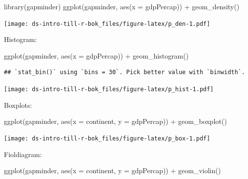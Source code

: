 \documentclass[
]{book}
\newenvironment{Shaded}{\begin{snugshade}}{\end{snugshade}}
\newcommand{\AttributeTok}[1]{\textcolor[rgb]{0.77,0.63,0.00}{#1}}
\newcommand{\FunctionTok}[1]{\textcolor[rgb]{0.00,0.00,0.00}{#1}}
\newcommand{\NormalTok}[1]{#1}
\newcommand{\SpecialCharTok}[1]{\textcolor[rgb]{0.00,0.00,0.00}{#1}}
\begin{document}
\begin{Shaded}
\begin{Highlighting}[]
\FunctionTok{library}\NormalTok{(gapminder)}
\FunctionTok{ggplot}\NormalTok{(gapminder, }\FunctionTok{aes}\NormalTok{(}\AttributeTok{x =}\NormalTok{ gdpPercap)) }\SpecialCharTok{+}
  \FunctionTok{geom\_density}\NormalTok{()}
\end{Highlighting}
\end{Shaded}

\texttt{[image: ds-intro-till-r-bok\_files/figure-latex/p\_den-1.pdf]}

Histogram:

\begin{Shaded}
\begin{Highlighting}[]
\FunctionTok{ggplot}\NormalTok{(gapminder, }\FunctionTok{aes}\NormalTok{(}\AttributeTok{x =}\NormalTok{ gdpPercap)) }\SpecialCharTok{+}
  \FunctionTok{geom\_histogram}\NormalTok{()}
\end{Highlighting}
\end{Shaded}

\begin{verbatim}
## `stat_bin()` using `bins = 30`. Pick better value with `binwidth`.
\end{verbatim}

\texttt{[image: ds-intro-till-r-bok\_files/figure-latex/p\_hist-1.pdf]}

Boxplots:

\begin{Shaded}
\begin{Highlighting}[]
\FunctionTok{ggplot}\NormalTok{(gapminder, }\FunctionTok{aes}\NormalTok{(}\AttributeTok{x =}\NormalTok{ continent, }\AttributeTok{y =}\NormalTok{ gdpPercap)) }\SpecialCharTok{+}
  \FunctionTok{geom\_boxplot}\NormalTok{()}
\end{Highlighting}
\end{Shaded}

\texttt{[image: ds-intro-till-r-bok\_files/figure-latex/p\_box-1.pdf]}

Fioldiagram:

\begin{Shaded}
\begin{Highlighting}[]
\FunctionTok{ggplot}\NormalTok{(gapminder, }\FunctionTok{aes}\NormalTok{(}\AttributeTok{x =}\NormalTok{ continent, }\AttributeTok{y =}\NormalTok{ gdpPercap)) }\SpecialCharTok{+}
  \FunctionTok{geom\_violin}\NormalTok{()}
\end{Highlighting}
\end{Shaded}
\end{document}

